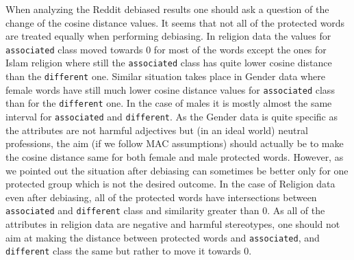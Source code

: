 \documentclass[12pt,]{book}
\begin{document}
When analyzing the Reddit debiased results one should ask a question of
the change of the cosine distance values. It seems that not all of the
protected words are treated equally when performing debiasing. In
religion data the values for \texttt{associated} class moved towards 0
for most of the words except the ones for Islam religion where still the
\texttt{associated} class has quite lower cosine distance than the
\texttt{different} one. Similar situation takes place in Gender data
where female words have still much lower cosine distance values for
\texttt{associated} class than for the \texttt{different} one. In the
case of males it is mostly almost the same interval for
\texttt{associated} and \texttt{different}. As the Gender data is quite
specific as the attributes are not harmful adjectives but (in an ideal
world) neutral professions, the aim (if we follow MAC assumptions)
should actually be to make the cosine distance same for both female and
male protected words. However, as we pointed out the situation after
debiasing can sometimes be better only for one protected group which is
not the desired outcome. In the case of Religion data even after
debiasing, all of the protected words have intersections between
\texttt{associated} and \texttt{different} class and similarity greater
than 0. As all of the attributes in religion data are negative and
harmful stereotypes, one should not aim at making the distance between
protected words and \texttt{associated}, and \texttt{different} class
the same but rather to move it towards 0.
\end{document}
